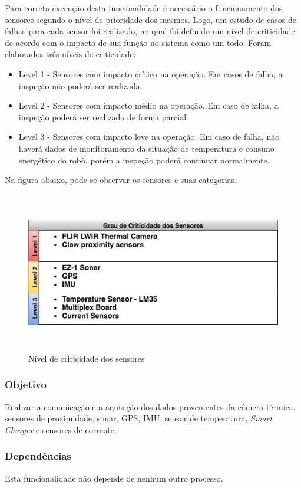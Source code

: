 Para correta execução desta funcionalidade é necessário o funcionamento dos sensores segundo o nível de prioridade dos mesmos. Logo, um estudo de casos de falhas para cada sensor foi realizado, no qual foi definido um nível de criticidade de acordo com o impacto de sua função no sistema como um todo. Foram elaborados três níveis de criticidade:
\begin{itemize}
	\item Level 1 - Sensores com impacto crítico na operação. Em casos de falha, a inspeção não poderá ser realizada.
	\item Level 2 - Sensores com impacto médio na operação. Em caso de falha, a inspeção poderá ser realizada de forma parcial.
	\item Level 3 - Sensores com impacto leve na operação. Em caso de falha, não haverá dados de monitoramento da situação de temperatura e consuno energético do robô, porém a inspeção poderá continuar normalmente.
\end{itemize}

Na figura abaixo, pode-se observar os sensores e suas categorias.

\begin{figure}[!ht]
	\centering
	\includegraphics[height=7cm, width=14cm]{Figures/criticidade.jpg}
	\caption{Nível de criticidade dos sensores} \label{FuncAquisition}
\end{figure}

\subsubsection{Objetivo}
Realizar a comunicação e a aquisição dos dados provenientes da câmera térmica, sensores de proximidade, sonar, GPS, IMU, sensor de temperatura, \textit{Smart Charger} e sensores de corrente.

\subsubsection{Dependências}
Esta funcionalidade não depende de nenhum outro processo.

